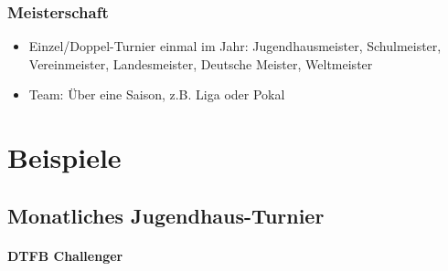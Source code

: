 \subsubsection{Meisterschaft}
\label{turniere:ergebnisse:rahmen:meisterschaft}

\begin{itemize}
\item Einzel/Doppel-Turnier einmal im Jahr: Jugendhausmeister, Schulmeister, Vereinmeister, Landesmeister, Deutsche Meister, Weltmeister
\item Team: Über eine Saison, z.B. Liga oder Pokal
\end{itemize}


\section{Beispiele}
\label{turniere:beispiele}


\subsection{Monatliches Jugendhaus-Turnier}
\label{turniere:beispiele:jugend}




\paragraph{DTFB Challenger}
\label{turniere:beispiele:challenger}
